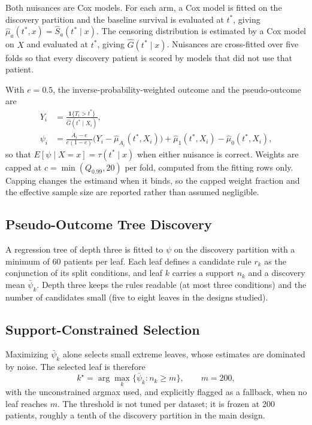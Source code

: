 \documentclass[conference]{IEEEtran}
\newcommand{\tstar}{t^{\ast}}
\begin{document}
Both nuisances are Cox models. For each arm, a Cox model is fitted on the
discovery partition and the baseline survival is evaluated at $\tstar$, giving
$\hat\mu_{a}(\tstar,x)=\hat S_{a}(\tstar\mid x)$. The censoring distribution is
estimated by a Cox model on $X$ and evaluated at $\tstar$, giving
$\hat G(\tstar\mid x)$. Nuisances are cross-fitted over five folds so that every
discovery patient is scored by models that did not use that patient.

With $e=0.5$, the inverse-probability-weighted outcome and the pseudo-outcome
are
\begin{align}
Y_{i} &= \frac{\mathbf{1}\{T_{i}>\tstar\}}{\hat G(\tstar\mid X_{i})},\\
\psi_{i} &= \frac{A_{i}-e}{e(1-e)}\big(Y_{i}-\hat\mu_{A_{i}}(\tstar,X_{i})\big)
+\hat\mu_{1}(\tstar,X_{i})-\hat\mu_{0}(\tstar,X_{i}),\label{eq:psi}
\end{align}
so that $E[\psi\mid X=x]=\tau(\tstar\mid x)$ when either nuisance is correct.
Weights are capped at $c=\min(Q_{0.99},20)$ per fold, computed from the fitting
rows only. Capping changes the estimand when it binds, so the capped weight
fraction and the effective sample size are reported rather than assumed
negligible.

\subsection{Pseudo-Outcome Tree Discovery}

A regression tree of depth three is fitted to $\psi$ on the discovery
partition with a minimum of 60 patients per leaf. Each leaf defines a candidate
rule $r_{k}$ as the conjunction of its split conditions, and leaf $k$ carries a
support $n_{k}$ and a discovery mean $\bar\psi_{k}$. Depth three keeps the
rules readable (at most three conditions) and the number of candidates small
(five to eight leaves in the designs studied).

\subsection{Support-Constrained Selection}

Maximizing $\bar\psi_{k}$ alone selects small extreme leaves, whose estimates
are dominated by noise. The selected leaf is therefore
\begin{equation}
k^{\star}=\arg\max_{k}\{\bar\psi_{k}: n_{k}\ge m\},\qquad m=200,
\label{eq:select}
\end{equation}
with the unconstrained argmax used, and explicitly flagged as a fallback, when
no leaf reaches $m$. The threshold is not tuned per dataset; it is frozen at
200 patients, roughly a tenth of the discovery partition in the main design.
\end{document}
